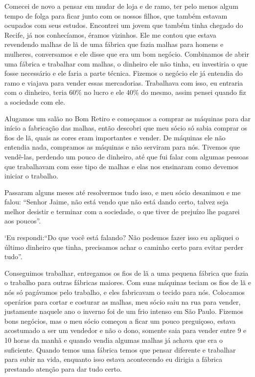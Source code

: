 Comecei de novo a pensar em mudar de loja e de ramo, ter pelo menos
algum tempo de folga para ficar junto com os nossos filhos, que também
estavam ocupados com seus estudos. Encontrei um jovem que também tinha
chegado do Recife, já nos conhecíamos, éramos vizinhos. Ele me contou
que estava revendendo malhas de lã de uma fábrica que fazia malhas para
homens e mulheres, conversamos e ele disse que era um bom negócio.
Combinamos de abrir uma fábrica e trabalhar com malhas, o dinheiro ele
não tinha, eu investiria o que fosse necessário e ele faria a parte
técnica. Fizemos o negócio ele já entendia do ramo e viajava para vender
essas mercadorias. Trabalhava com isso, eu entraria com o dinheiro,
teria 60\% no lucro e ele 40\% do mesmo, assim pensei quando fiz a
sociedade com ele.

Alugamos um salão no Bom Retiro e começamos a comprar as máquinas para
dar início a fabricação das malhas, então descobri que meu sócio só
sabia comprar os fios de lã, quais as cores eram importantes e vender.
De máquinas ele não entendia nada, compramos as máquinas e não serviram
para nós. Tivemos que vendê-las, perdendo um pouco de dinheiro, até que
fui falar com algumas pessoas que trabalhavam com esse tipo de malhas e
elas nos ensinaram como devemos iniciar o trabalho.

Passaram alguns meses até resolvermos tudo isso, e meu sócio desanimou e
me falou: ``Senhor Jaime, não está vendo que não está dando certo,
talvez seja melhor desistir e terminar com a sociedade, o que tiver de
prejuízo lhe pagarei aos poucos''.

`Eu respondi:``Do que você está falando? Não podemos fazer isso eu
apliquei o último dinheiro que tinha, precisamos achar o caminho certo
para evitar perder tudo''.

Conseguimos trabalhar, entregamos os fios de lã a uma pequena fábrica
que fazia o trabalho para outras fábricas maiores. Com suas máquinas
teciam os fios de lã e nós só pagávamos pelo trabalho, e eles fabricavam
o tecido para nós. Colocamos operários para cortar e costurar as malhas,
meu sócio saiu na rua para vender, justamente naquele ano o inverno foi
de um frio intenso em São Paulo. Fizemos bons negócios, mas o meu sócio
começou a ficar um pouco preguiçoso, estava acostumado a ser um vendedor
e não o dono, somente saia para vender entre 9 e 10 horas da manhã e
quando vendia algumas malhas já achava que era o suficiente. Quando
temos uma fábrica temos que pensar diferente e trabalhar para subir na
vida, enquanto isso estava acontecendo eu dirigia a fábrica prestando
atenção para dar tudo certo.

